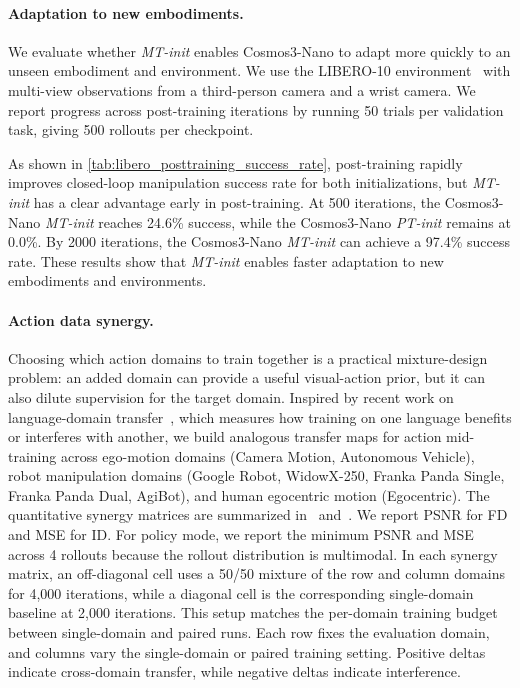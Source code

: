 

\paragraph{Adaptation to new embodiments.}
We evaluate whether \textit{MT-init} enables Cosmos3-Nano to adapt more quickly to an unseen embodiment and environment.
We use the LIBERO-10 environment~\citep{liu2023libero} with multi-view observations from a third-person camera and a wrist camera.
We report progress across post-training iterations by running 50 trials per validation task, giving 500 rollouts per checkpoint.

As shown in \cref{tab:libero_posttraining_success_rate}, post-training rapidly improves closed-loop manipulation success rate for both initializations, but \textit{MT-init} has a clear advantage early in post-training.
At 500 iterations, the Cosmos3-Nano \textit{MT-init} reaches 24.6\% success, while the Cosmos3-Nano \textit{PT-init} remains at 0.0\%.
By 2000 iterations, the Cosmos3-Nano \textit{MT-init} can achieve a 97.4\% success rate.
These results show that \textit{MT-init} enables faster adaptation to new embodiments and environments.



\paragraph{Action data synergy.}
\label{app:action_data_synergy}
Choosing which action domains to train together is a practical mixture-design problem: an added domain can provide a useful visual-action prior, but it can also dilute supervision for the target domain.
Inspired by recent work on language-domain transfer~\citep{longpre2026atlas}, which measures how training on one language benefits or interferes with another, we build analogous transfer maps for action mid-training across ego-motion domains (Camera Motion, Autonomous Vehicle), robot manipulation domains (Google Robot, WidowX-250, Franka Panda Single, Franka Panda Dual, AgiBot), and human egocentric motion (Egocentric).
The quantitative synergy matrices are summarized in~ and~.
We report PSNR for FD and MSE for ID.
For policy mode, we report the minimum PSNR and MSE across 4 rollouts because the rollout distribution is multimodal.
In each synergy matrix, an off-diagonal cell uses a 50/50 mixture of the row and column domains for 4{,}000 iterations, while a diagonal cell is the corresponding single-domain baseline at 2{,}000 iterations.
This setup matches the per-domain training budget between single-domain and paired runs.
Each row fixes the evaluation domain, and columns vary the single-domain or paired training setting.
Positive deltas indicate cross-domain transfer, while negative deltas indicate interference.

